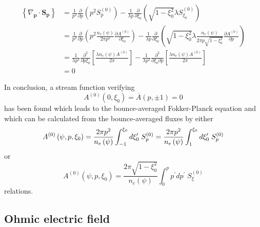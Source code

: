 \begin{align}
\left\{ \nabla_{\mathbf{p}}\cdot\mathbf{S}_{\mathbf{p}}\right\} & =\frac
{1}{p^{2}}\frac{\partial}{\partial p}\left( p^{2}S_{p}^{\left( 0\right)
}\right) -\frac{1}{\lambda p}\frac{\partial}{\partial\xi_{0}}\left( \sqrt{
1-\xi_{0}^{2}}\lambda S_{\xi_{0}}^{\left( 0\right) }\right)  \nonumber \\
& =\frac{1}{p^{2}}\frac{\partial}{\partial p}\left( p^{2}\frac{n_{e}\left(
\psi\right) }{2\pi p^{2}}\frac{\partial A^{\left( 0\right) }}{\partial
\xi_{0}}\right) -\frac{1}{\lambda p}\frac{\partial}{\partial\xi_{0}}\left(
\sqrt{1-\xi_{0}^{2}}\lambda\frac{n_{e}\left( \psi\right) }{2\pi p\sqrt
{1-\xi_{0}^{2}}}\frac{\partial A^{\left( 0\right) }}{\partial p}\right)
\nonumber \\
& =\frac{1}{\lambda p^{2}}\frac{\partial^{2}}{\partial p\xi_{0}}\left[ \frac{
\lambda n_{e}\left( \psi\right) A^{\left( 0\right) }}{2\pi}\right] -\frac{1}{
\lambda p^{2}}\frac{\partial^{2}}{\partial\xi_{0}\partial p}\left[ \frac{
\lambda n_{e}\left( \psi\right) A^{\left( 0\right) }}{2\pi}\right]  \nonumber
\\
& =0  \label{kinbav4}
\end{align}

In conclusion, a stream function verifying
\begin{equation}
A^{\left( 0\right) }\left( 0,\xi_{0}\right) =\overline{A}\left(
p,\pm1\right) =0
\end{equation}
has been found which leads to the bounce-averaged Fokker-Planck equation and
which can be calculated from the bounce-averaged fluxes by either
\begin{equation}
A^{\left( 0\right) }\left( \psi,p,\xi_{0}\right) =\frac{2\pi p^{2}}{%
n_{e}\left( \psi\right) }\int_{-1}^{\xi_{0}}d\xi_{0}^{\prime}\;S_{p}^{\left(
0\right) }=\frac{2\pi p^{2}}{n_{e}\left( \psi\right) }\int_{1}^{\xi_{0}}d%
\xi_{0}^{\prime}\;S_{p}^{\left( 0\right) }  \label{stream1}
\end{equation}
or
\begin{equation}
A^{\left( 0\right) }\left( \psi,p,\xi_{0}\right) =\frac{2\pi\sqrt
{1-\xi_{0}^{2}}}{n_{e}\left( \psi\right) }\int_{0}^{p}p^{\prime}dp^{\prime
}\;S_{\xi}^{\left( 0\right) }  \label{stream2}
\end{equation}
relations.

\subsection{Ohmic electric field}


